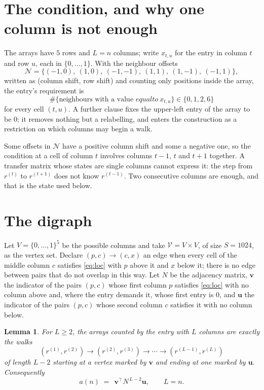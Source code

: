 \documentclass[11pt,a4paper]{article}
\theoremstyle{plain}
\newtheorem{lemma}[theorem]{Lemma}
\theoremstyle{definition}
\begin{document}
\section{The condition, and why one column is not enough}

The arrays have $5$ rows and $L=n$ columns; write $x_{t,u}$ for the entry in
column $t$ and row $u$, each in $\{0,\dots,1\}$. With the neighbour offsets
\[
\mathcal N=\{(-1,0),\ (1,0),\ (-1,-1),\ (1,1),\ (1,-1),\ (-1,1)\},
\]
written as (column shift, row shift) and counting only positions inside the array, the
entry's requirement is
\begin{equation}\label{eq:loc}
\#\{\text{neighbours with a value }equal to\ x_{t,u}\}\in\{0,1,2,6\}
\end{equation}
for every cell $(t,u)$. A further clause fixes the upper-left entry of the array to be $0$; it removes nothing but a relabelling, and enters the construction as a restriction on which columns may begin a walk.

Some offsets in $\mathcal N$ have a positive column shift and some a negative one, so the
condition at a cell of column $t$ involves columns $t-1$, $t$ and $t+1$ together. A transfer
matrix whose states are single columns cannot express it: the step from $r^{(t)}$ to
$r^{(t+1)}$ does not know $r^{(t-1)}$. Two consecutive columns are enough, and that is
the state used below.

\section{The digraph}

Let $V=\{0,\dots,1\}^{5}$ be the possible columns and take
$\mathcal V=V\times V$, of size $S=1024$, as the vertex set. Declare $(p,c)\to(c,x)$ an edge
when every cell of the middle column $c$ satisfies \eqref{eq:loc} with $p$ above it and $x$
below it; there is no edge between pairs that do not overlap in this way. Let $N$ be the
adjacency matrix, $\mathbf{v}$ the indicator of the pairs $(p,c)$ whose first column $p$
satisfies \eqref{eq:loc} with no column above and, where the entry demands it, whose first entry is $0$, and $\mathbf{u}$ the indicator of
the pairs $(p,c)$ whose second column $c$ satisfies it with no column below.

\begin{lemma}\label{lem:walk}
For $L\ge2$, the arrays counted by the entry with $L$ columns are exactly the walks
\[
(r^{(1)},r^{(2)})\to(r^{(2)},r^{(3)})\to\cdots\to(r^{(L-1)},r^{(L)})
\]
of length $L-2$ starting at a vertex marked by $\mathbf{v}$ and ending at one marked by
$\mathbf{u}$. Consequently
\[
a(n)\;=\;\,\mathbf{v}^{\!\top}N^{\,L-2}\mathbf{u},\qquad L=n .
\]
\end{lemma}
\end{document}
